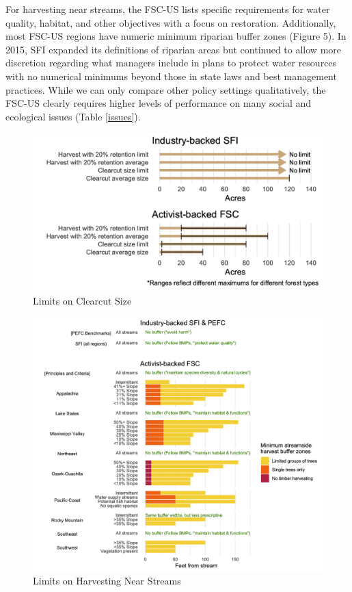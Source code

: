 \documentclass[
      12pt,
            Review ]{article}
\begin{document}
For harvesting near streams, the FSC-US lists specific requirements for
water quality, habitat, and other objectives with a focus on
restoration. Additionally, most FSC-US regions have numeric minimum
riparian buffer zones (Figure 5). In 2015, SFI expanded its definitions
of riparian areas but continued to allow more discretion regarding what
managers include in plans to protect water resources with no numerical
minimums beyond those in state laws and best management practices. While
we can only compare other policy settings qualitatively, the FSC-US
clearly requires higher levels of performance on many social and
ecological issues (Table \ref{issues}).

\begin{figure}
\centering
\includegraphics{Figs/clearcuts-1.png}
\caption{Limits on Clearcut Size}
\end{figure}

\begin{figure}
\centering
\includegraphics{Figs/riparian-1.png}
\caption{Limits on Harvesting Near Streams}
\end{figure}
\end{document}
